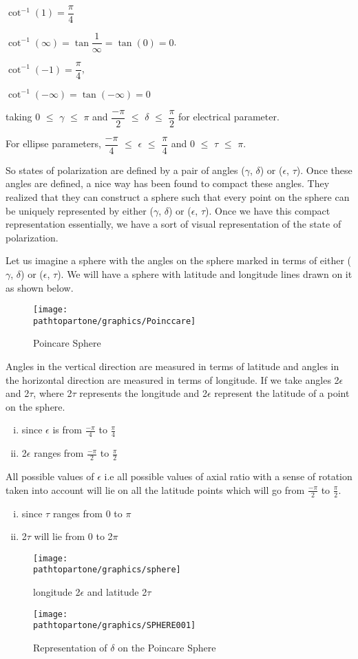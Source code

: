 $\cot^{-1}(1)= \dfrac{\pi}{4}$

$\cot^{-1}(\infty)= \tan \dfrac{1}{\infty}= \tan(0)= 0$.

$\cot^{-1}(-1) = \dfrac{\pi}{4}$, 

$\cot^{-1}(-\infty) = \tan(-\infty) = 0$

taking  0 $\leq$ $\gamma$ $\leq$ $\pi$  and $\dfrac{-\pi}{2}$ $\leq$ $\delta$ $\leq$ $\dfrac{\pi}{2}$ for electrical parameter.

For ellipse parameters, $\dfrac{-\pi}{4}$ $\leq$ $\epsilon$ $\leq$ $\dfrac{\pi}{4}$ and 0 $\leq$ $\tau$ $\leq$ $\pi$.

So states of polarization are defined by a pair of angles ($\gamma$, $\delta$) or ($\epsilon$, $\tau$). Once these angles are defined, a nice way has been found to compact these angles. They realized that they can construct a sphere such that every point on the sphere can be uniquely represented by either ($\gamma$, $\delta$) or ($\epsilon$, $\tau$). Once we have this compact representation essentially, we have a sort of visual representation of the state of polarization. 

Let us imagine a sphere with the angles on the sphere marked in terms of either ($\gamma$, $\delta$) or ($\epsilon$, $\tau$). We will have a sphere with latitude and longitude lines drawn on it as shown below.
\begin{figure}[h]
\centering
\texttt{[image: \\pathtopartone/graphics/Poinccare]}
\caption{Poincare Sphere}
\label{fig:poinccare}
\end{figure}

Angles in the vertical direction are measured in terms of latitude and angles in the horizontal direction are measured in terms of longitude. If we take angles 2$\epsilon$ and 2$\tau$, where 2$\tau$ represents the longitude and 2$\epsilon$ represent the latitude of a point on the sphere.
\begin{enumerate}[(i)]
\item	since $\epsilon$ is from $\frac{-\pi}{4}$ to $\frac{\pi}{4}$
\item 	2$\epsilon$ ranges from $\frac{-\pi}{2}$ to $\frac{\pi}{2}$
\end{enumerate}
All possible values of $\epsilon$ i.e all possible values of axial ratio with a sense of rotation taken into account will lie on all the latitude points which will go from $\frac{-\pi}{2}$ to $\frac{\pi}{2}$. 
\begin{enumerate}[(i)]
\item 	since $\tau$ ranges from 0 to $\pi$
\item 	2$\tau$ will lie from 0 to 2$\pi$
\end{enumerate}
\begin{figure}[h]
\centering
\texttt{[image: \\pathtopartone/graphics/sphere]}
\caption{longitude 2$\epsilon$ and latitude 2$\tau$}
\end{figure}
\begin{figure}[h]
\centering
\texttt{[image: \\pathtopartone/graphics/SPHERE001]}
\caption{Representation of $\delta$ on the Poincare Sphere}
\label{fig:sphere001}
\end{figure}

